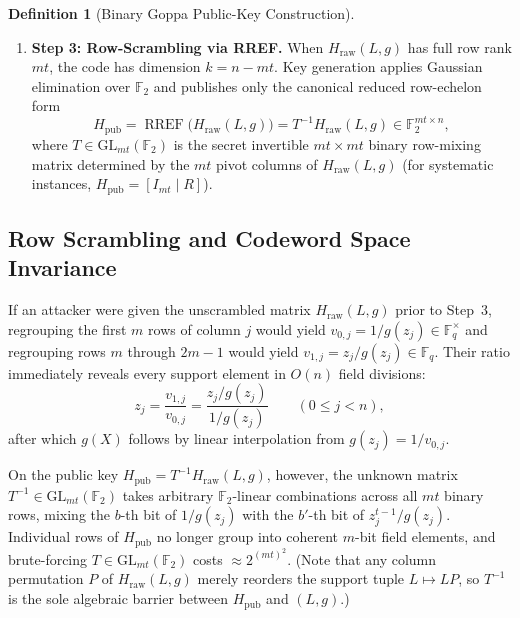 \documentclass[11pt,a4paper]{article}
\theoremstyle{definition}
\newtheorem{definition}{Definition}
\theoremstyle{remark}
\newcommand{\F}{\mathbb{F}}
\newcommand{\RREF}{\operatorname{RREF}}
\begin{document}
\begin{definition}[Binary Goppa Public-Key Construction]
\begin{enumerate}[leftmargin=2em]
\begin{equation}
        = \ker_{\F_2}\!\big(H_{\text{raw}}(L, g)\big).
    \end{equation}
    \item \textbf{Step 3: Row-Scrambling via RREF.}
    When $H_{\text{raw}}(L, g)$ has full row rank $mt$, the code has dimension $k = n - mt$. Key generation applies Gaussian elimination over $\F_2$ and publishes only the canonical reduced row-echelon form
    \begin{equation}
    \label{eq:h-pub}
        H_{\text{pub}} = \RREF\!\big(H_{\text{raw}}(L, g)\big) = T^{-1} H_{\text{raw}}(L, g) \in \F_2^{mt \times n},
    \end{equation}
    where $T \in \mathrm{GL}_{mt}(\F_2)$ is the secret invertible $mt \times mt$ binary row-mixing matrix determined by the $mt$ pivot columns of $H_{\text{raw}}(L, g)$ (for systematic instances, $H_{\text{pub}} = [I_{mt} \mid R]$).
\end{enumerate}
\end{definition}

\subsection{Row Scrambling and Codeword Space Invariance}
If an attacker were given the unscrambled matrix $H_{\text{raw}}(L, g)$ prior to Step~3, regrouping the first $m$ rows of column $j$ would yield $v_{0, j} = 1 / g(z_j) \in \F_q^\times$ and regrouping rows $m$ through $2m - 1$ would yield $v_{1, j} = z_j / g(z_j) \in \F_q$. Their ratio immediately reveals every support element in $O(n)$ field divisions:
\begin{equation}
\label{eq:direct-ratio}
    z_j = \frac{v_{1, j}}{v_{0, j}} = \frac{z_j / g(z_j)}{1 / g(z_j)} \qquad (0 \le j < n),
\end{equation}
after which $g(X)$ follows by linear interpolation from $g(z_j) = 1 / v_{0, j}$.

On the public key $H_{\text{pub}} = T^{-1} H_{\text{raw}}(L, g)$, however, the unknown matrix $T^{-1} \in \mathrm{GL}_{mt}(\F_2)$ takes arbitrary $\F_2$-linear combinations across all $mt$ binary rows, mixing the $b$-th bit of $1 / g(z_j)$ with the $b'$-th bit of $z_j^{t-1} / g(z_j)$. Individual rows of $H_{\text{pub}}$ no longer group into coherent $m$-bit field elements, and brute-forcing $T \in \mathrm{GL}_{mt}(\F_2)$ costs $\approx 2^{(mt)^2}$. (Note that any column permutation $P$ of $H_{\text{raw}}(L, g)$ merely reorders the support tuple $L \mapsto L P$, so $T^{-1}$ is the sole algebraic barrier between $H_{\text{pub}}$ and $(L, g)$.)
\end{document}
